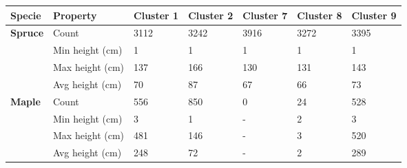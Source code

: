\begin{table}[htb!]
  \centering
	    \begin{tabular}{|p{2cm}|p{2cm}|p{1.5cm}|p{1.5cm}|p{1.5cm}|p{1.5cm}|p{1.5cm}|}
		\hline	
		\textbf{Specie} & \textbf{Property} & \textbf{Cluster 1} & \textbf{Cluster 2} & \textbf{Cluster 7} & \textbf{Cluster 8} & \textbf{Cluster 9} \\
		\hline
		\multirow{4}{*}{\textbf{Spruce}} & 
						\multicolumn{1}{l|}{Count} & 
						\multicolumn{1}{l|}{3112} & 
						\multicolumn{1}{l|}{3242} &
						\multicolumn{1}{l|}{3916} & 
						\multicolumn{1}{l|}{3272} & 
						\multicolumn{1}{l|}{3395} \\\cline{2-7} &
						\multicolumn{1}{l|}{Min height (cm)} & 
						\multicolumn{1}{l|}{1} & 
						\multicolumn{1}{l|}{1} &
						\multicolumn{1}{l|}{1} &
						\multicolumn{1}{l|}{1} & 
						\multicolumn{1}{l|}{1} \\\cline{2-7} &
						\multicolumn{1}{l|}{Max height (cm)} & 
						\multicolumn{1}{l|}{137} & 
						\multicolumn{1}{l|}{166} &
						\multicolumn{1}{l|}{130} &
						\multicolumn{1}{l|}{131} & 
						\multicolumn{1}{l|}{143} \\\cline{2-7} &
						\multicolumn{1}{l|}{Avg height (cm)} & 
						\multicolumn{1}{l|}{70} & 
						\multicolumn{1}{l|}{87} &
						\multicolumn{1}{l|}{67} &
						\multicolumn{1}{l|}{66} & 
						\multicolumn{1}{l|}{73} \\\cline{2-6}
		\hline       
		\multirow{4}{*}{\textbf{Maple}} & 
						\multicolumn{1}{l|}{Count} & 
						\multicolumn{1}{l|}{556} & 
						\multicolumn{1}{l|}{850} &
						\multicolumn{1}{l|}{0} &
						\multicolumn{1}{l|}{24} & 
						\multicolumn{1}{l|}{528} \\\cline{2-7} &
						\multicolumn{1}{l|}{Min height (cm)} & 
						\multicolumn{1}{l|}{3} & 
						\multicolumn{1}{l|}{1} &
						\multicolumn{1}{l|}{-} & 
						\multicolumn{1}{l|}{2} &
						\multicolumn{1}{l|}{3} \\\cline{2-7} &
						\multicolumn{1}{l|}{Max height (cm)} & 
						\multicolumn{1}{l|}{481} & 
						\multicolumn{1}{l|}{146} &
						\multicolumn{1}{l|}{-} & 
						\multicolumn{1}{l|}{3} &
						\multicolumn{1}{l|}{520} \\\cline{2-7} &
						\multicolumn{1}{l|}{Avg height (cm)} & 
						\multicolumn{1}{l|}{248} & 
						\multicolumn{1}{l|}{72} &
						\multicolumn{1}{l|}{-} & 
						\multicolumn{1}{l|}{2} &
						\multicolumn{1}{l|}{289} \\\cline{2-7}
		\hline      

\end{tabular}
\end{table}

